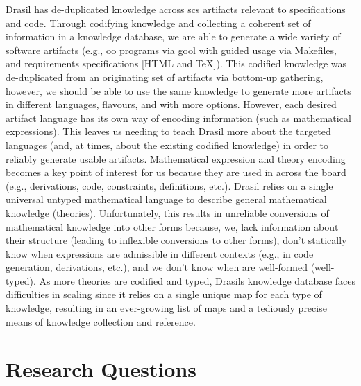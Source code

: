 Drasil has de-duplicated knowledge across \acs{scs} artifacts relevant to
specifications and code. Through codifying knowledge and collecting a coherent
set of information in a knowledge database, we are able to generate a wide
variety of software artifacts (e.g., \acs{oo} programs via \acs{gool} with
guided usage via Makefiles, and requirements specifications [HTML and TeX]).
This codified knowledge was de-duplicated from an originating set of artifacts
via bottom-up gathering, however, we should be able to use the same knowledge to
generate more artifacts in different languages, flavours, and with more options.
However, each desired artifact language has its own way of encoding information
(such as mathematical expressions). This leaves us needing to teach Drasil more
about the targeted languages (and, at times, about the existing codified
knowledge) in order to reliably generate usable artifacts. Mathematical
expression and theory encoding becomes a key point of interest for us because
they are used in across the board (e.g., derivations, code, constraints,
definitions, etc.). Drasil relies on a single universal untyped mathematical
language to describe general mathematical knowledge (theories). Unfortunately,
this results in unreliable conversions of mathematical knowledge into other
forms because, we, lack information about their structure (leading to inflexible
conversions to other forms), don't statically know when expressions are
admissible in different contexts (e.g., in code generation, derivations, etc.),
and we don't know when are well-formed (well-typed). As more theories are
codified and typed, Drasils knowledge database faces difficulties in scaling
since it relies on a single unique map for each type of knowledge, resulting in
an ever-growing list of maps and a tediously precise means of knowledge
collection and reference.

\section{Research Questions}
\label{sec:intro:researchquestions}

